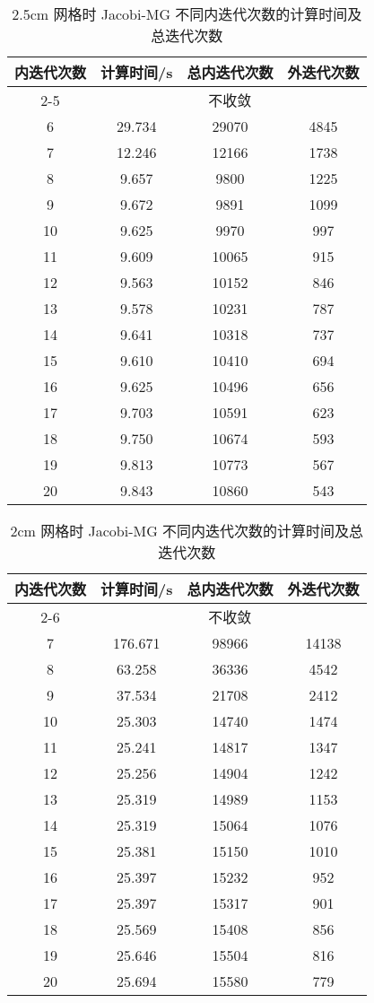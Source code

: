 \begin{datasheet}
\begin{table}
\centering
\caption{2.5cm 网格时 Jacobi-MG 不同内迭代次数的计算时间及总迭代次数}
\label{tab:equsolve.iter.jacobi-mg.2.5cm}
\begin{tabular}{cccc}
\toprule
内迭代次数 & 计算时间/s & 总内迭代次数 & 外迭代次数\\
\midrule
2-5 & \multicolumn{3}{c}{不收敛} \\ %
6 & 29.734 & 29070 & 4845\\
7 & 12.246 & 12166 & 1738\\
8 & 9.657 & 9800 & 1225\\
9 & 9.672 & 9891 & 1099\\
10 & 9.625 & 9970 & 997\\
11 & 9.609 & 10065 & 915\\
12 & 9.563 & 10152 & 846\\
13 & 9.578 & 10231 & 787\\
14 & 9.641 & 10318 & 737\\
15 & 9.610 & 10410 & 694\\
16 & 9.625 & 10496 & 656\\
17 & 9.703 & 10591 & 623\\
18 & 9.750 & 10674 & 593\\
19 & 9.813 & 10773 & 567\\
20 & 9.843 & 10860 & 543\\
\bottomrule
\end{tabular}
\end{table}

\begin{table}
\centering
\caption{2cm 网格时 Jacobi-MG 不同内迭代次数的计算时间及总迭代次数}
\label{tab:equsolve.iter.jacobi-mg.2cm}
\begin{tabular}{cccc}
\toprule
内迭代次数 & 计算时间/s & 总内迭代次数 & 外迭代次数\\
\midrule
2-6 & \multicolumn{3}{c}{不收敛} \\ %
7 & 176.671 & 98966 & 14138\\
8 & 63.258 & 36336 & 4542\\
9 & 37.534 & 21708 & 2412\\
10 & 25.303 & 14740 & 1474\\
11 & 25.241 & 14817 & 1347\\
12 & 25.256 & 14904 & 1242\\
13 & 25.319 & 14989 & 1153\\
14 & 25.319 & 15064 & 1076\\
15 & 25.381 & 15150 & 1010\\
16 & 25.397 & 15232 & 952\\
17 & 25.397 & 15317 & 901\\
18 & 25.569 & 15408 & 856\\
19 & 25.646 & 15504 & 816\\
20 & 25.694 & 15580 & 779\\
\bottomrule
\end{tabular}
\end{table}



\end{datasheet}

